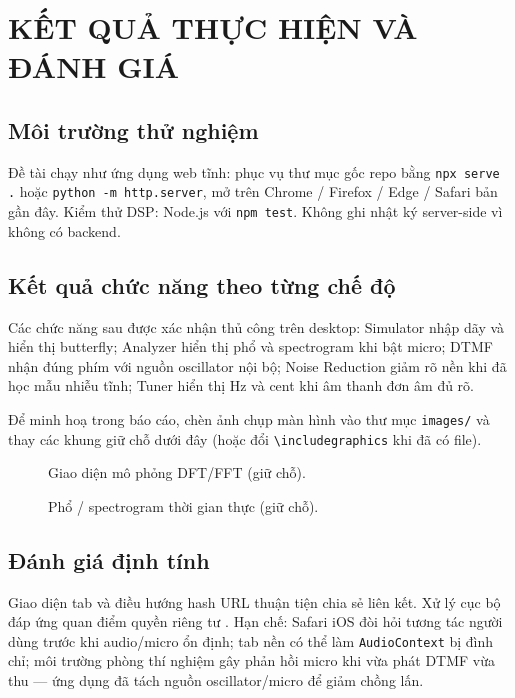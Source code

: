 \pagestyle{fancy}
\chapter{KẾT QUẢ THỰC HIỆN VÀ ĐÁNH GIÁ}

\section{Môi trường thử nghiệm}
Đề tài chạy như ứng dụng web tĩnh: phục vụ thư mục gốc repo bằng \texttt{npx serve .} hoặc \texttt{python -m http.server}, mở trên Chrome / Firefox / Edge / Safari bản gần đây. Kiểm thử DSP: Node.js với \texttt{npm test}. Không ghi nhật ký server-side vì không có backend.

\section{Kết quả chức năng theo từng chế độ}
Các chức năng sau được xác nhận thủ công trên desktop: Simulator nhập dãy và hiển thị butterfly; Analyzer hiển thị phổ và spectrogram khi bật micro; DTMF nhận đúng phím với nguồn oscillator nội bộ; Noise Reduction giảm rõ nền khi đã học mẫu nhiễu tĩnh; Tuner hiển thị Hz và cent khi âm thanh đơn âm đủ rõ.

Để minh hoạ trong báo cáo, chèn ảnh chụp màn hình vào thư mục \verb|images/| và thay các khung giữ chỗ dưới đây (hoặc đổi \verb|\includegraphics| khi đã có file).

\begin{figure}[htbp]
	\centering
	\caption{Giao diện mô phỏng DFT/FFT (giữ chỗ).}
	\label{fig:res-sim}
\end{figure}

\begin{figure}[htbp]
	\centering
	\caption{Phổ / spectrogram thời gian thực (giữ chỗ).}
	\label{fig:res-analyzer}
\end{figure}

\section{Đánh giá định tính}
Giao diện tab và điều hướng hash URL thuận tiện chia sẻ liên kết. Xử lý cục bộ đáp ứng quan điểm quyền riêng tư \cite{repoWebFFT}. Hạn chế: Safari iOS đòi hỏi tương tác người dùng trước khi audio/micro ổn định; tab nền có thể làm \texttt{AudioContext} bị đình chỉ; môi trường phòng thí nghiệm gây phản hồi micro khi vừa phát DTMF vừa thu --- ứng dụng đã tách nguồn oscillator/micro để giảm chồng lấn.


